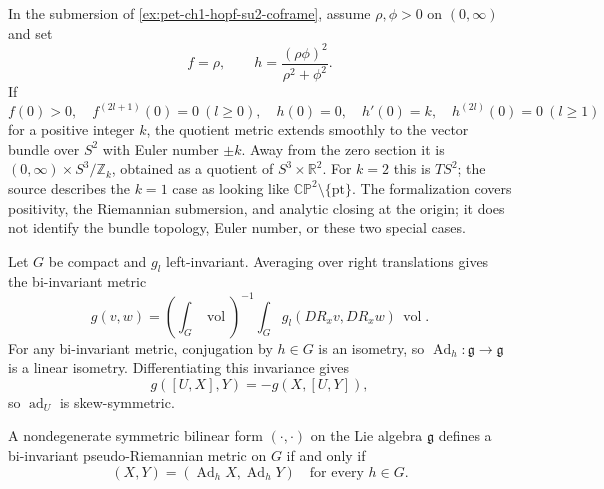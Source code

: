 \begin{remark}
  \label{rem:pet-ch1-ex-23}

  In the submersion of \cref{ex:pet-ch1-hopf-su2-coframe}, assume
  $\rho,\phi>0$ on $(0,\infty)$ and set
  \[
    f=\rho,
    \qquad
    h=\frac{(\rho\phi)^2}{\rho^2+\phi^2}.
  \]
  If
  \[
    f(0)>0,
    \quad f^{(2l+1)}(0)=0\ (l\ge0),
    \quad h(0)=0,
    \quad h'(0)=k,
    \quad h^{(2l)}(0)=0\ (l\ge1)
  \]
  for a positive integer $k$, the quotient metric extends smoothly to the
  vector bundle over $S^2$ with Euler number $\pm k$. Away from the zero
  section it is $(0,\infty)\times S^3/\mathbb{Z}_k$, obtained as a quotient of
  $S^3\times\mathbb{R}^2$. For $k=2$ this is $TS^2$; the source describes the
  $k=1$ case as looking like $\mathbb{CP}^2\setminus\{\mathrm{pt}\}$.
  The formalization covers positivity,
  the Riemannian submersion, and analytic closing at the origin; it does not
  identify the bundle topology, Euler number, or these two special cases.
\end{remark}

\begin{remark}
  \label{rem:pet-ch1-ex-24}


  Let $G$ be compact and $g_l$ left-invariant. Averaging over right
  translations gives the bi-invariant metric
  \[
    g(v,w)=\left(\int_G\operatorname{vol}\right)^{-1}
      \int_G g_l(DR_xv,DR_xw)\,\operatorname{vol}.
  \]
  For any bi-invariant metric, conjugation by $h\in G$ is an isometry, so
  $\operatorname{Ad}_h:\mathfrak g\to\mathfrak g$ is a linear isometry.
  Differentiating this invariance gives
  \[
    g([U,X],Y)=-g(X,[U,Y]),
  \]
  so $\operatorname{ad}_U$ is skew-symmetric.
\end{remark}

\begin{remark}
  \label{rem:pet-ch1-ex-25}


  A nondegenerate symmetric bilinear form $(\cdot,\cdot)$ on the Lie algebra
  $\mathfrak g$ defines a bi-invariant pseudo-Riemannian metric on $G$ if and
  only if
  \[
    (X,Y)=(\operatorname{Ad}_hX,\operatorname{Ad}_hY)
    \quad\text{for every }h\in G.
  \]
\end{remark}

